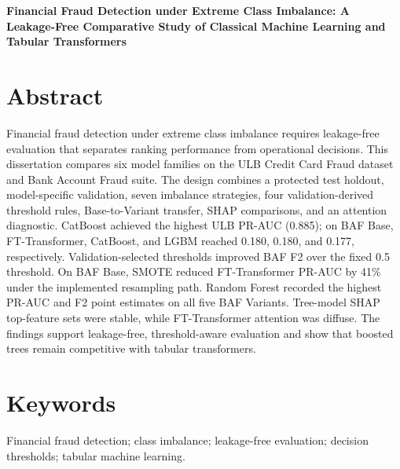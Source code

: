 \begin{center}
\textbf{Financial Fraud Detection under Extreme Class Imbalance: A Leakage-Free Comparative Study of Classical Machine Learning and Tabular Transformers}
\end{center}

\section*{Abstract}
\label{sec:abstract}

Financial fraud detection under extreme class imbalance requires leakage-free evaluation that separates ranking performance from operational decisions. This dissertation compares six model families on the ULB Credit Card Fraud dataset and Bank Account Fraud suite. The design combines a protected test holdout, model-specific validation, seven imbalance strategies, four validation-derived threshold rules, Base-to-Variant transfer, SHAP comparisons, and an attention diagnostic. CatBoost achieved the highest ULB PR-AUC (0.885); on BAF Base, FT-Transformer, CatBoost, and LGBM reached 0.180, 0.180, and 0.177, respectively. Validation-selected thresholds improved BAF F2 over the fixed 0.5 threshold. On BAF Base, SMOTE reduced FT-Transformer PR-AUC by 41\% under the implemented resampling path. Random Forest recorded the highest PR-AUC and F2 point estimates on all five BAF Variants. Tree-model SHAP top-feature sets were stable, while FT-Transformer attention was diffuse. The findings support leakage-free, threshold-aware evaluation and show that boosted trees remain competitive with tabular transformers.

\section*{Keywords}
\label{sec:keywords}

Financial fraud detection; class imbalance; leakage-free evaluation; decision thresholds; tabular machine learning.
